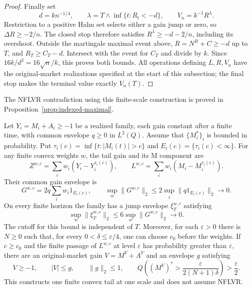 \begin{proof}
Finally set
\[
 d=kn^{-1/4},\qquad
 \lambda=T\wedge\inf\{t:R_t<-d\},\qquad V_n=k^{-1}R^\lambda.
\]
Restriction to a positive Hahn set selects either a gain jump or zero,
so $\Delta R\geq-2/n$. The closed stop therefore satisfies
$R^\lambda\geq-d-2/n$, including its overshoot.
Outside the martingale maximal event above, $R=N^R+C\geq-d$ up to $T$,
and $R_T\geq C_T-d$. Intersect with the event for $C_T$ and divide by $k$.
Since $16k/d^2=16\sqrt n/k$, this proves both bounds.
All operations defining $L,R,V_n$ have the original-market realizations
specified at the start of this subsection; the final stop makes the
terminal value exactly $V_n(T)$.
\end{proof}
The NFLVR contradiction using this finite-scale construction is proved in
Proposition~\ref{prop:indexed-maximal}.

\begin{lemma}
\label{lem:quantitative-tails}
Let $Y_i=M_i+A_i\geq-1$ be a realized family, each gain constant after a
finite time, with common envelope $q\geq0$ in $L^2(Q)$. Assume that
$\{M_i^*\}_i$ is bounded in probability. Put $\tau_i(c)=\inf\{t:|M_i(t)|>c\}$ and
$E_i(c)=\{\tau_i(c)<\infty\}$.
For any finite convex weights $w$, the tail gain and its M component are
\[
 Z^{w,c}=\sum_iw_i(Y_i-Y_i^{\tau_i(c)}),\qquad
 L^{w,c}=\sum_iw_i(M_i-M_i^{\tau_i(c)}).
\]
Their common gain envelope is
\[
 G^{w,c}=2q\sum_iw_i1_{E_i(c)},\qquad
 \sup_w\|G^{w,c}\|_2\leq2\sup_i\|q1_{E_i(c)}\|_2\longrightarrow0.
\]
On every finite horizon the family has a jump envelope $\xi_T^{w,c}$ satisfying
\[
 \sup_w\|\xi_T^{w,c}\|_2\leq6\sup_w\|G^{w,c}\|_2\to0.
\]
The cutoff for this bound is independent of $T$.
Moreover, for each $\varepsilon>0$ there is $N\geq0$ such that, for every
$0<\delta\leq\varepsilon/4$, one can choose $c_0$ before the weights.
If $c\geq c_0$ and the finite passage of $L^{w,c}$ at level $\varepsilon$
has probability greater than $\varepsilon$, there are an original-market
gain $V=M^V+A^V$ and an envelope $g$ satisfying
\[
 V\geq-1,\qquad |V|\leq g,\qquad \|g\|_2\leq1,\qquad
 Q\!\left((M^V)^*>\frac{\varepsilon}{2(N+1)\delta}\right)>\frac\varepsilon2.
\]
This constructs one finite convex tail at one scale and does not assume NFLVR.

\end{lemma}
